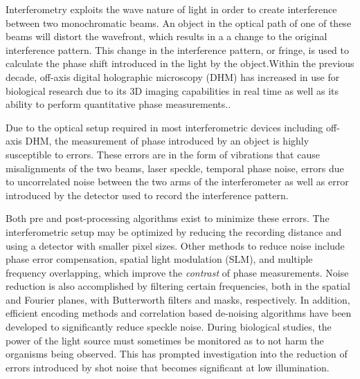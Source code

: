 \documentclass[10pt,letterpaper]{article}
\begin{document}
Interferometry exploits the wave nature of light in order to create interference between two monochromatic beams. An object in the optical path of one of these beams will distort the wavefront, which results in a a change to the original interference pattern. This change in the interference pattern, or fringe, is used to calculate the phase shift introduced in the light by the object\cite{creath1988v}.Within the previous decade, off-axis digital holographic microscopy (DHM) has increased in use for biological research due to its 3D imaging capabilities in real time as well as its ability to perform quantitative phase measurements.\cite{cuche1999digital, mann2006quantitative, kim2006interference}.\par

Due to the optical setup required in most interferometric devices including off-axis DHM, the measurement of phase introduced by an object is highly susceptible to errors. These errors are in the form of vibrations that cause misalignments of the two beams, laser speckle, temporal phase noise, errors due to uncorrelated noise between the two arms of the interferometer as well as error introduced by the detector used to record the interference pattern.\par

Both pre and post-processing algorithms exist to minimize these errors. The interferometric setup may be optimized by reducing the recording distance and using a detector with smaller pixel sizes\cite{wang2014point}. Other methods to reduce noise include phase error compensation, spatial light modulation (SLM), and multiple frequency overlapping\cite{wang2015new, pan2011coherent, zhang2011coherent, le2015improving, lai2015resolution}, which improve the \textit{contrast} of phase measurements. Noise reduction is also accomplished by filtering certain frequencies, both in the spatial and Fourier planes, with Butterworth filters and masks, respectively\cite{matrecano2015improving, sharma2008improvement, cuche2000spatial}. In addition, efficient encoding methods and correlation based de-noising algorithms have been developed to significantly reduce speckle noise\cite{memmolo2014encoding, molaei2014imaging}. During biological studies, the power of the light source must sometimes be monitored as to not harm the organisms being observed. This has prompted investigation into the reduction of errors introduced by shot noise that becomes significant at low illumination\cite{charriere2006shot, demoli2014digital}. \par
\end{document}
